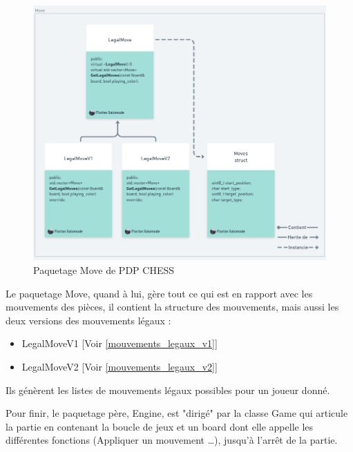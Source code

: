\huge\documentclass{article}
\begin{document}
\begin{figure}[!h]
    \centering
    \includegraphics[scale = 0.3]{img/Package/Move.png}
    \caption{Paquetage Move de PDP CHESS}
    \label{pck:move}
\end{figure}
Le paquetage Move, quand à lui, gère tout ce qui est en rapport avec les mouvements des pièces, il contient la structure des mouvements, mais aussi les deux versions des mouvements légaux :
\begin{itemize}
    \item LegalMoveV1 [Voir \ref{mouvements_legaux_v1}]
    \item LegalMoveV2 [Voir \ref{mouvements_legaux_v2}]
\end{itemize}
Ils génèrent les listes de mouvements légaux possibles pour un joueur donné.
\medskip

Pour finir, le paquetage père, Engine, est "dirigé" par la classe Game qui articule la partie en contenant la boucle de jeux et un board dont elle appelle les différentes fonctions (Appliquer un mouvement \dots), jusqu'à l'arrêt de la partie.
\end{document}

